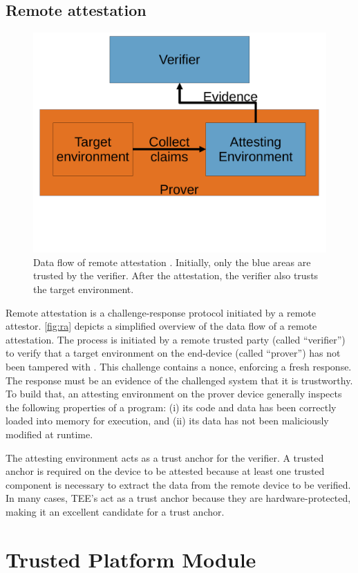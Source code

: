 \subsection{Remote attestation}

\begin{figure}
  \centering
  \includegraphics[trim={0 5cm 0 0}, width=0.5\linewidth]{figures/remote_attestation.pdf}
  \caption{Data flow of remote attestation \cite{rfc9334}. Initially, only the blue areas are trusted by the verifier. After the attestation, the verifier also trusts the target environment.} \label{fig:ra}
\end{figure}

Remote attestation is a challenge-response protocol initiated by a remote attestor. \autoref{fig:ra} depicts a simplified overview of the data flow of a remote attestation.
The process is initiated by a remote trusted party (called ``verifier'') to verify that a target environment on the end-device (called ``prover'') has not been tampered with \cite{Menetrey2022, Coker2011}. This challenge contains a nonce, enforcing a fresh response.
The response must be an evidence of the challenged system that it is trustworthy. To build that, an attesting environment on the prover device generally inspects the following properties of a program: (i) its code and data has been correctly loaded into memory for execution, and (ii) its data has not been maliciously modified at runtime.

The attesting environment acts as a trust anchor for the verifier.
A trusted anchor is required on the device to be attested because at least one trusted component is necessary to extract the data from the remote device to be verified. In many cases, TEE's act as a trust anchor because they are hardware-protected, making it an excellent candidate for a trust anchor.

\section{Trusted Platform Module}

